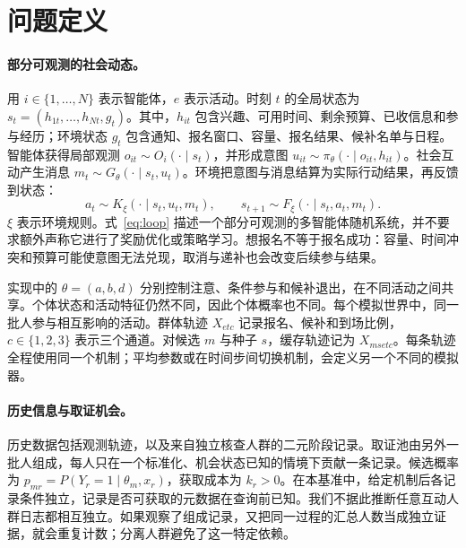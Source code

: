 \section{问题定义}
\label{sec:setup}
\paragraph{部分可观测的社会动态。}
用 $i\in\{1,\ldots,N\}$ 表示智能体，$e$ 表示活动。时刻 $t$ 的全局状态为 $s_t=(h_{1t},\ldots,h_{Nt},g_t)$。其中，$h_{it}$ 包含兴趣、可用时间、剩余预算、已收信息和参与经历；环境状态 $g_t$ 包含通知、报名窗口、容量、报名结果、候补名单与日程。智能体获得局部观测 $o_{it}\sim O_i(\cdot\mid s_t)$，并形成意图 $u_{it}\sim\pi_\theta(\cdot\mid o_{it},h_{it})$。社会互动产生消息 $m_t\sim G_\theta(\cdot\mid s_t,u_t)$。环境把意图与消息结算为实际行动结果，再反馈到状态：
\begin{equation}
 a_t\sim K_\xi(\cdot\mid s_t,u_t,m_t),\qquad
 s_{t+1}\sim F_\xi(\cdot\mid s_t,a_t,m_t).
 \label{eq:loop}
\end{equation}
$\xi$ 表示环境规则。式~\eqref{eq:loop} 描述一个部分可观测的多智能体随机系统，并不要求额外声称它进行了奖励优化或策略学习。想报名不等于报名成功：容量、时间冲突和预算可能使意图无法兑现，取消与递补也会改变后续参与结果。

实现中的 $\theta=(a,b,d)$ 分别控制注意、条件参与和候补退出，在不同活动之间共享。个体状态和活动特征仍然不同，因此个体概率也不同。每个模拟世界中，同一批人参与相互影响的活动。群体轨迹 $X_{etc}$ 记录报名、候补和到场比例，$c\in\{1,2,3\}$ 表示三个通道。对候选 $m$ 与种子 $s$，缓存轨迹记为 $X_{msetc}$。每条轨迹全程使用同一个机制；平均参数或在时间步间切换机制，会定义另一个不同的模拟器。

\paragraph{历史信息与取证机会。}
历史数据包括观测轨迹，以及来自独立核查人群的二元阶段记录。取证池由另外一批人组成，每人只在一个标准化、机会状态已知的情境下贡献一条记录。候选概率为 $p_{mr}=P(Y_r=1\mid\theta_m,x_r)$，获取成本为 $k_r>0$。在本基准中，给定机制后各记录条件独立，记录是否可获取的元数据在查询前已知。我们不据此推断任意互动人群日志都相互独立。如果观察了组成记录，又把同一过程的汇总人数当成独立证据，就会重复计数；分离人群避免了这一特定依赖。

